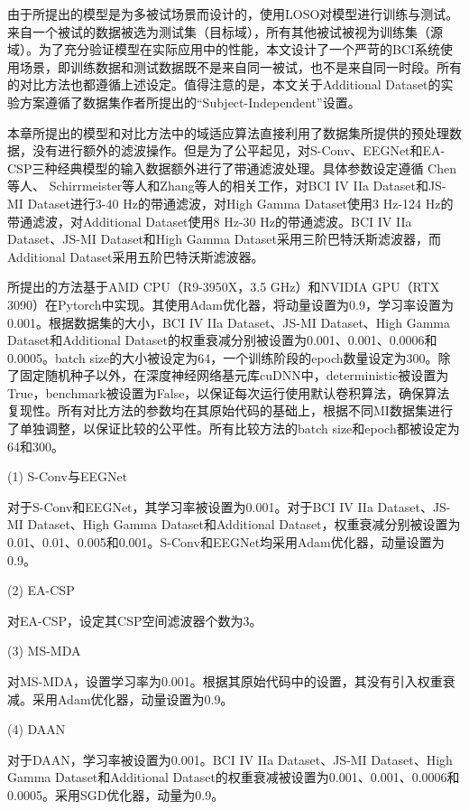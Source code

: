 由于所提出的模型是为多被试场景而设计的，使用LOSO对模型进行训练与测试。来自一个被试的数据被选为测试集（目标域），所有其他被试被视为训练集（源域）。为了充分验证模型在实际应用中的性能，本文设计了一个严苛的BCI系统使用场景，即训练数据和测试数据既不是来自同一被试，也不是来自同一时段。所有的对比方法也都遵循上述设定。值得注意的是，本文关于Additional Dataset的实验方案遵循了数据集作者所提出的“Subject-Independent”设置\cite{4-12, 4-13}。

本章所提出的模型和对比方法中的域适应算法直接利用了数据集所提供的预处理数据，没有进行额外的滤波操作。但是为了公平起见，对S-Conv、EEGNet和EA-CSP三种经典模型的输入数据额外进行了带通滤波处理。具体参数设定遵循 Chen等人\cite{4-21}、 Schirrmeister等人\cite{4-11}和Zhang等人\cite{4-13}的相关工作，对BCI IV IIa Dataset和JS-MI Dataset进行3-40 Hz的带通滤波，对High Gamma Dataset使用3 Hz-124 Hz的带通滤波，对Additional Dataset使用8 Hz-30 Hz的带通滤波。BCI IV IIa Dataset、JS-MI Dataset和High Gamma Dataset采用三阶巴特沃斯滤波器，而Additional Dataset采用五阶巴特沃斯滤波器。

所提出的方法基于AMD CPU（R9-3950X，3.5 GHz）和NVIDIA GPU（RTX 3090）在Pytorch中实现。其使用Adam优化器，将动量设置为0.9，学习率设置为0.001。根据数据集的大小，BCI IV IIa Dataset、JS-MI Dataset、High Gamma Dataset和Additional Dataset的权重衰减分别被设置为0.001、0.001、0.0006和0.0005。batch size的大小被设定为64，一个训练阶段的epoch数量设定为300。除了固定随机种子以外，在深度神经网络基元库cuDNN中，deterministic被设置为True，benchmark被设置为False，以保证每次运行使用默认卷积算法，确保算法复现性。所有对比方法的参数均在其原始代码的基础上，根据不同MI数据集进行了单独调整，以保证比较的公平性。所有比较方法的batch size和epoch都被设定为64和300。

(1) S-Conv与EEGNet

对于S-Conv和EEGNet，其学习率被设置为0.001。对于BCI IV IIa Dataset、JS-MI Dataset、High Gamma Dataset和Additional Dataset，权重衰减分别被设置为0.01、0.01、0.005和0.001。S-Conv和EEGNet均采用Adam优化器，动量设置为0.9。

(2) EA-CSP

对EA-CSP，设定其CSP空间滤波器个数为3。

(3) MS-MDA

对MS-MDA，设置学习率为0.001。根据其原始代码中的设置，其没有引入权重衰减。采用Adam优化器，动量设置为0.9。

(4) DAAN

对于DAAN，学习率被设置为0.001。BCI IV IIa Dataset、JS-MI Dataset、High Gamma Dataset和Additional Dataset的权重衰减被设置为0.001、0.001、0.0006和0.0005。采用SGD优化器，动量为0.9。

